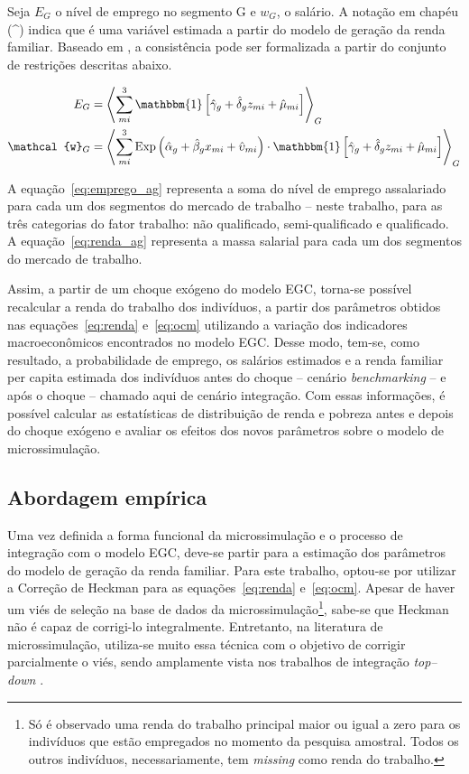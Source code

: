 Seja $E_G$ o nível de emprego no segmento G e $w_G$, o salário. A notação em chapéu (\^{}) indica que é uma variável estimada a partir do modelo de geração da renda familiar. Baseado em \textcite{bourguignon05}, a consistência pode ser formalizada a partir do conjunto de restrições descritas abaixo.

\begin{align}
	E_G &= \left\langle \sum_{mi}^{3} \mathbbm{1} \left[ \hat{\gamma}_g + \hat{\delta}_g z_{mi} + \hat{\mu}_{mi} \right] \right\rangle_{G} \label{eq:emprego_ag} \\
	\mathcal{w}_G &= \left\langle \sum_{mi}^{3} \text{Exp} \left( \hat{\alpha}_g + \hat{\beta}_g x_{mi} + \hat{\upsilon}_{mi} \right) \cdot \mathbbm{1} \left[ \hat{\gamma}_g + \hat{\delta}_g z_{mi} + \hat{\mu}_{mi} \right] \right\rangle_{G} \label{eq:renda_ag}
\end{align}

A equação~\eqref{eq:emprego_ag} representa a soma do nível de emprego assalariado para cada um dos segmentos do mercado de trabalho -- neste trabalho, para as três categorias do fator trabalho: não qualificado, semi-qualificado e qualificado. A equação~\eqref{eq:renda_ag} representa a massa salarial para cada um dos segmentos do mercado de trabalho.

Assim, a partir de um choque exógeno do modelo EGC, torna-se possível recalcular a renda do trabalho dos indivíduos, a partir dos parâmetros obtidos nas equações~\eqref{eq:renda} e~\eqref{eq:ocm} utilizando a variação dos indicadores macroeconômicos encontrados no modelo EGC. Desse modo, tem-se, como resultado, a probabilidade de emprego, os salários estimados e a renda familiar per capita estimada dos indivíduos antes do choque -- cenário \textit{benchmarking} -- e após o choque -- chamado aqui de cenário integração. Com essas informações, é possível calcular as estatísticas de distribuição de renda e pobreza antes e depois do choque exógeno e avaliar os efeitos dos novos parâmetros sobre o modelo de microssimulação.



\subsection{Abordagem empírica} \label{subsec:abordagem_empirica}

Uma vez definida a forma funcional da microssimulação e o processo de integração com o modelo EGC, deve-se partir para a estimação dos parâmetros do modelo de geração da renda familiar. Para este trabalho, optou-se por utilizar a Correção de Heckman para as equações~\eqref{eq:renda} e~\eqref{eq:ocm}. Apesar de haver um viés de seleção na base de dados da microssimulação\footnote{Só é observado uma renda do trabalho principal maior ou igual a zero para os indivíduos que estão empregados no momento da pesquisa amostral. Todos os outros indivíduos, necessariamente, tem \textit{missing} como renda do trabalho.}, sabe-se que Heckman não é capaz de corrigi-lo integralmente. Entretanto, na literatura de microssimulação, utiliza-se muito essa técnica com o objetivo de corrigir parcialmente o viés, sendo amplamente vista nos trabalhos de integração \textit{top--down} \cite{bourguignon05, colombo08, cury16}.


